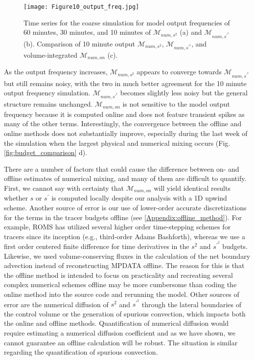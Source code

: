 \documentclass[draft]{agujournal2019}
\begin{document}
\begin{figure}[ht!]
 \centerline{\texttt{[image: Figure10\_output\_freq.jpg]}}
  \caption{Time series for the coarse simulation for model output frequencies of 60 minutes, 30 minutes, and 10 minutes of $\mathcal{M}_{num, s^2}$ (a) and $\mathcal{M}_{num, s^{\prime^2}}$ (b). Comparison of 10 minute output $\mathcal{M}_{num, s^2}$, $\mathcal{M}_{num, s^{\prime^2}}$, and volume-integrated $\mathcal{M}_{num, on}$  (c).}
  \label{fig:mixing_time_series}
\end{figure}

As the output frequency increases, $\mathcal{M}_{num,s^2}$ appears to converge towards $\mathcal{M}_{num,s^{\prime^2}}$ but still remains noisy, with the two in much better agreement for the 10 minute output frequency simulation.  $\mathcal{M}_{num,s^{\prime^2}}$ becomes slightly less noisy but the general structure remains unchanged. $\mathcal{M}_{num,on}$ is not sensitive to the model output frequency because it is computed online and does not feature transient spikes as many of the other terms. Interestingly, the convergence between the offline and online methods does not substantially improve, especially during the last week of the simulation when the largest physical and numerical mixing occurs (Fig. \ref{fig:budget_comparison} d). 

There are a number of factors that could cause the difference between on- and offline estimates of numerical mixing, and many of them are difficult to quantify. First, we cannot say with certainty that $\mathcal{M}_{num, on}$ will yield identical results whether $s$ or $s^{\prime}$ is computed locally despite our analysis with a 1D upwind scheme.  Another source of error is our use of lower-order accurate discretizations for the terms in the tracer budgets offline (see \ref{Appendix:offline_method}). For example, ROMS has utilized several higher order time-stepping schemes for tracers since its inception (e.g., third-order Adams Bashforth), whereas we use a first order centered finite difference for time derivatives in the $s^2$ and $s^{\prime^2}$ budgets. Likewise, we used volume-conserving fluxes in the calculation of the net boundary advection instead of reconstructing MPDATA offline. The reason for this is that the offline method is intended to focus on practicality and recreating several complex numerical schemes offline may be more cumbersome than coding the online method into the source code and rerunning the model. Other sources of error are the numerical diffusion of $s^2$ and $s^{\prime^2}$ through the lateral boundaries of the control volume or the generation of spurious convection, which impacts both the online and offline methods. Quantification of numerical diffusion would require estimating a numerical diffusion coefficient and as we have shown, we cannot guarantee an offline calculation will be robust. The situation is similar regarding the quantification of spurious convection. 
\end{document}
